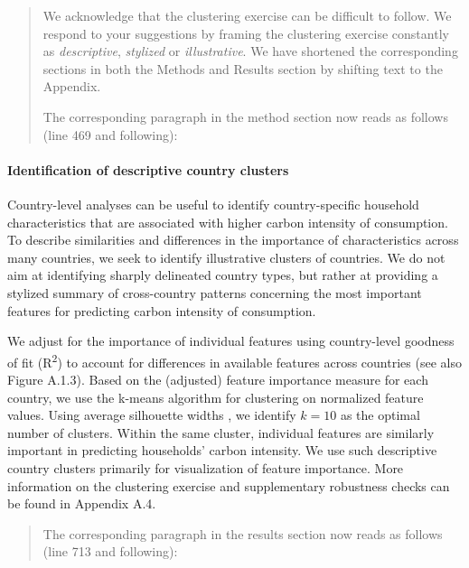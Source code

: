 \documentclass[11pt]{article}
\newenvironment{response}
{\begin{quote}\color{black}}
{\end{quote}}
\begin{document}
\begin{response}
    We acknowledge that the clustering exercise can be difficult to follow. We respond to your suggestions by framing the clustering exercise constantly as \textit{descriptive}, \textit{stylized} or \textit{illustrative}. We have shortened the corresponding sections in both the Methods and Results section by shifting text to the Appendix. 

    The corresponding paragraph in the method section now reads as follows (line 469 and following):   
\end{response}

\begin{revisionbox}
    \paragraph{Identification of descriptive country clusters} Country-level analyses can be useful to identify country-specific household characteristics that are associated with higher carbon intensity of consumption. To describe similarities and differences in the importance of characteristics across many countries, we seek to identify illustrative clusters of countries. We do not aim at identifying sharply delineated country types, but rather at providing a stylized summary of cross-country patterns concerning the most important features for predicting carbon intensity of consumption.

    We adjust for the importance of individual features using country-level goodness of fit (R\textsuperscript{2}) to account for differences in available features across countries (see also Figure A.1.3). Based on the (adjusted) feature importance measure for each country, we use the k-means algorithm \autocite{MacQueen.1967} for clustering on normalized feature values. Using average silhouette widths \autocite{Rousseeuw.1987}, we identify $k=10$ as the optimal number of clusters. Within the same cluster, individual features are similarly important in predicting households' carbon intensity. We use such descriptive country clusters primarily for visualization of feature importance. More information on the clustering exercise and supplementary robustness checks can be found in Appendix A.4. 
\end{revisionbox}

\begin{response}
    The corresponding paragraph in the results section now reads as follows (line 713 and following):
\end{response}
\end{document}
